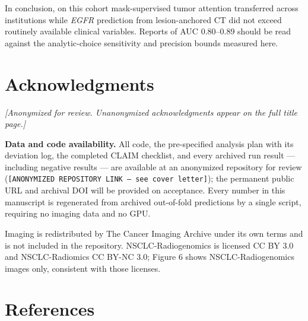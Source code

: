 \documentclass[11pt]{article}
\begin{document}
In conclusion, on this cohort mask-supervised tumor attention transferred across
institutions while \textit{EGFR} prediction from lesion-anchored CT did not exceed
routinely available clinical variables. Reports of AUC 0.80--0.89 should be read
against the analytic-choice sensitivity and precision bounds measured here.

\section*{Acknowledgments}

\textit{[Anonymized for review. Unanonymized acknowledgments appear on the full
title page.]}

\textbf{Data and code availability.} All code, the pre-specified analysis plan
with its deviation log, the completed CLAIM checklist, and every archived run
result --- including negative results --- are available at an anonymized
repository for review (\texttt{[ANONYMIZED REPOSITORY LINK --- see cover
letter]}); the permanent public URL and archival DOI will be provided on
acceptance. Every number in this manuscript is regenerated from archived
out-of-fold predictions by a single script, requiring no imaging data and no GPU.

Imaging is redistributed by The Cancer Imaging Archive under its own terms and is
not included in the repository. NSCLC-Radiogenomics is licensed CC BY 3.0 and
NSCLC-Radiomics CC BY-NC 3.0; Figure 6 shows NSCLC-Radiogenomics images only,
consistent with those licenses.

\clearpage
\section*{References}
\end{document}
